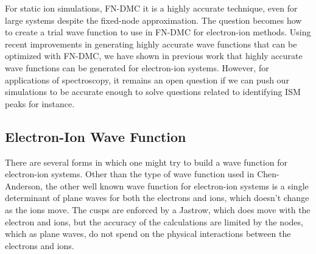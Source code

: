 \documentclass[aip,jcp,numerical,reprint]{revtex4-1}
\begin{document}
For static ion simulations, FN-DMC  it is a highly accurate technique, even for large systems despite the fixed-node approximation.  The question becomes how to create a trial wave function to use in FN-DMC for electron-ion methods.
Using recent improvements in generating highly accurate wave functions that can be optimized with FN-DMC, we have shown in previous work that highly accurate wave functions can be generated for electron-ion systems.  However, for applications of spectroscopy, it remains an open question if we can push our simulations to be accurate enough to solve questions related to identifying ISM peaks for instance.


\subsection{Electron-Ion Wave Function}
 There are several forms in which one might try to build a wave function for electron-ion systems.  Other than the type of wave function used in Chen-Anderson, the other well known wave function for electron-ion systems is a single determinant of plane waves for both the electrons and ions, which doesn't change as the ions move.  The cusps are enforced by a Jastrow, which does move with the electron and ions, but the accuracy of the calculations are limited by the nodes, which as plane waves, do not spend on the physical interactions between the electrons and ions.  
 
\end{document}
